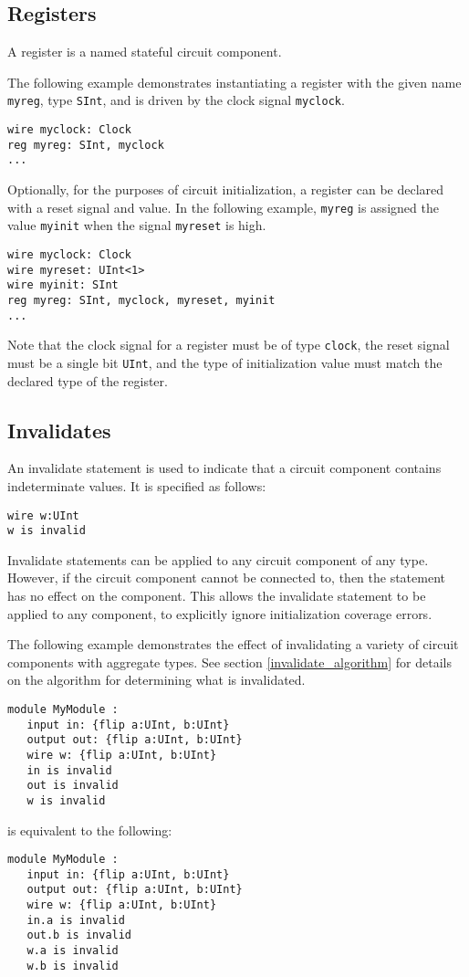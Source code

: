 \documentclass[12pt]{article}
\begin{document}
\subsection{Registers}
A register is a named stateful circuit component.

The following example demonstrates instantiating a register with the given name \verb|myreg|, type \verb|SInt|, and is driven by the clock signal \verb|myclock|. 

\begin{verbatim}
wire myclock: Clock
reg myreg: SInt, myclock
...
\end{verbatim}

Optionally, for the purposes of circuit initialization, a register can be declared with a reset signal and value. In the following example, \verb|myreg| is assigned the value \verb|myinit| when the signal \verb|myreset| is high.

\begin{verbatim}
wire myclock: Clock
wire myreset: UInt<1>
wire myinit: SInt
reg myreg: SInt, myclock, myreset, myinit
...
\end{verbatim}

Note that the clock signal for a register must be of type \verb|clock|, the reset signal must be a single bit \verb|UInt|, and the type of initialization value must match the declared type of the register.

\subsection{Invalidates}
An invalidate statement is used to indicate that a circuit component contains indeterminate values. It is specified as follows:

\begin{verbatim}
wire w:UInt
w is invalid
\end{verbatim}

Invalidate statements can be applied to any circuit component of any type. However, if the circuit component cannot be connected to, then the statement has no effect on the component. This allows the invalidate statement to be applied to any component, to explicitly ignore initialization coverage errors.

The following example demonstrates the effect of invalidating a variety of circuit components with aggregate types. See section \ref{invalidate_algorithm} for details on the algorithm for determining what is invalidated.

\begin{verbatim}
module MyModule :
   input in: {flip a:UInt, b:UInt}
   output out: {flip a:UInt, b:UInt}
   wire w: {flip a:UInt, b:UInt}
   in is invalid
   out is invalid
   w is invalid
\end{verbatim}
is equivalent to the following:
\begin{verbatim}
module MyModule :
   input in: {flip a:UInt, b:UInt}
   output out: {flip a:UInt, b:UInt}
   wire w: {flip a:UInt, b:UInt}
   in.a is invalid
   out.b is invalid
   w.a is invalid
   w.b is invalid
\end{verbatim}
\end{document}
